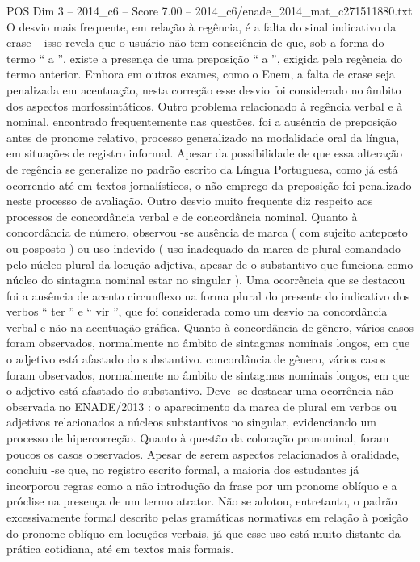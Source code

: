 \begin{textsample}{POS Dim 3 – 2014\_c6 – Score 7.00 – 2014\_c6/enade\_2014\_mat\_c271511880.txt}
O desvio mais frequente, em relação à regência, é a falta do sinal indicativo da crase – isso revela que o usuário não tem consciência de que, sob a forma do termo “ a ”, existe a presença de uma preposição “ a ”, exigida pela regência do termo anterior.
Embora em outros exames, como o Enem, a falta de crase seja penalizada em acentuação, nesta correção esse desvio foi considerado no âmbito dos aspectos morfossintáticos.
Outro problema relacionado à regência verbal e à nominal, encontrado frequentemente nas questões, foi a ausência de preposição antes de pronome relativo, processo generalizado na modalidade oral da língua, em situações de registro informal.
Apesar da possibilidade de que essa alteração de regência se generalize no padrão escrito da Língua Portuguesa, como já está ocorrendo até em textos jornalísticos, o não emprego da preposição foi penalizado neste processo de avaliação.
Outro desvio muito frequente diz respeito aos processos de concordância verbal e de concordância nominal.
Quanto à concordância de número, observou -se ausência de marca ( com sujeito anteposto ou posposto ) ou uso indevido ( uso inadequado da marca de plural comandado pelo núcleo plural da locução adjetiva, apesar de o substantivo que funciona como núcleo do sintagma nominal estar no singular ).
Uma ocorrência que se destacou foi a ausência de acento circunflexo na forma plural do presente do indicativo dos verbos “ ter ” e “ vir ”, que foi considerada como um desvio na concordância verbal e não na acentuação gráfica.
Quanto à concordância de gênero, vários casos foram observados, normalmente no âmbito de sintagmas nominais longos, em que o adjetivo está afastado do substantivo. concordância de gênero, vários casos foram observados, normalmente no âmbito de sintagmas nominais longos, em que o adjetivo está afastado do substantivo.
Deve -se destacar uma ocorrência não observada no ENADE/2013 : o aparecimento da marca de plural em verbos ou adjetivos relacionados a núcleos substantivos no singular, evidenciando um processo de hipercorreção.
Quanto à questão da colocação pronominal, foram poucos os casos observados.
Apesar de serem aspectos relacionados à oralidade, concluiu -se que, no registro escrito formal, a maioria dos estudantes já incorporou regras como a não introdução da frase por um pronome oblíquo e a próclise na presença de um termo atrator.
Não se adotou, entretanto, o padrão excessivamente formal descrito pelas gramáticas normativas em relação à posição do pronome oblíquo em locuções verbais, já que esse uso está muito distante da prática cotidiana, até em textos mais formais.

\end{textsample}
